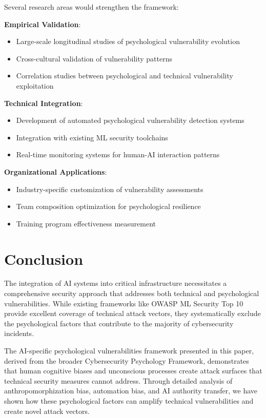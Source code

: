 \documentclass[11pt,a4paper]{article}
\begin{document}
Several research areas would strengthen the framework:

\textbf{Empirical Validation}:
\begin{itemize}
\item Large-scale longitudinal studies of psychological vulnerability evolution
\item Cross-cultural validation of vulnerability patterns
\item Correlation studies between psychological and technical vulnerability exploitation
\end{itemize}

\textbf{Technical Integration}:
\begin{itemize}
\item Development of automated psychological vulnerability detection systems
\item Integration with existing ML security toolchains
\item Real-time monitoring systems for human-AI interaction patterns
\end{itemize}

\textbf{Organizational Applications}:
\begin{itemize}
\item Industry-specific customization of vulnerability assessments
\item Team composition optimization for psychological resilience
\item Training program effectiveness measurement
\end{itemize}

\section{Conclusion}

The integration of AI systems into critical infrastructure necessitates a comprehensive security approach that addresses both technical and psychological vulnerabilities. While existing frameworks like OWASP ML Security Top 10 provide excellent coverage of technical attack vectors, they systematically exclude the psychological factors that contribute to the majority of cybersecurity incidents.

The AI-specific psychological vulnerabilities framework presented in this paper, derived from the broader Cybersecurity Psychology Framework\cite{canale2025}, demonstrates that human cognitive biases and unconscious processes create attack surfaces that technical security measures cannot address. Through detailed analysis of anthropomorphization bias, automation bias, and AI authority transfer, we have shown how these psychological factors can amplify technical vulnerabilities and create novel attack vectors.
\end{document}
